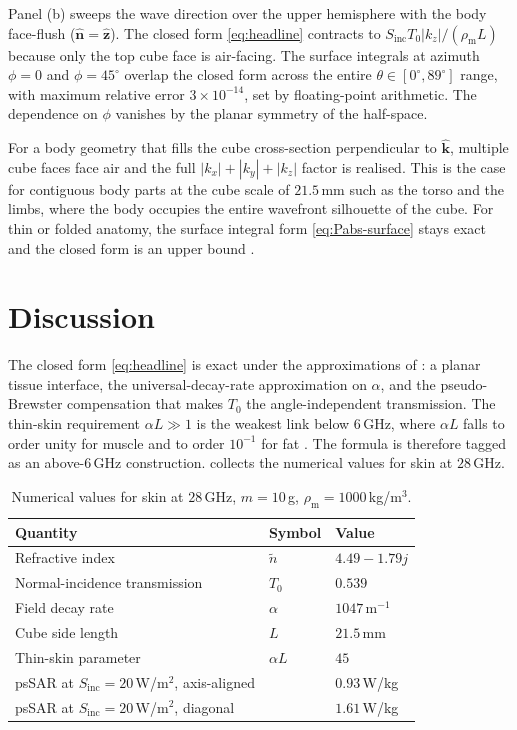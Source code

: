\documentclass[journal,twocolumn,10pt]{IEEEtran}
\theoremstyle{plain}
\theoremstyle{remark}
\newcommand{\khat}{\hat{\bm{k}}}
\newcommand{\nhat}{\hat{\bm{n}}}
\newcommand{\Sinc}{S_{\mathrm{inc}}}
\newcommand{\rhom}{\rho_{\mathrm{m}}}
\newcommand{\ntilde}{\tilde{n}}
\begin{document}
Panel (b) sweeps the wave direction over the upper hemisphere with
the body face-flush ($\nhat = \hat{\mathbf{z}}$). The closed form
\eqref{eq:headline} contracts to $\Sinc T_0 |k_z| / (\rhom L)$
because only the top cube face is air-facing. The surface integrals
at azimuth $\phi = 0$ and $\phi = 45^\circ$ overlap the closed form
across the entire $\theta \in [0^\circ, 89^\circ]$ range, with
maximum relative error $3 \times 10^{-14}$, set by floating-point
arithmetic. The dependence on $\phi$ vanishes by the planar symmetry
of the half-space.

For a body geometry that fills the cube cross-section perpendicular
to $\khat$, multiple cube faces face air and the full
$|k_x|+|k_y|+|k_z|$ factor is realised. This is the case for
contiguous body parts at the cube scale of $21.5\,$mm such as the
torso and the limbs, where the body occupies the entire wavefront
silhouette of the cube. For thin or folded anatomy, the surface
integral form \eqref{eq:Pabs-surface} stays exact and the closed
form is an upper bound \cite{WydaegheTAP_A}.


\section{Discussion}\label{sec:disc}

The closed form \eqref{eq:headline} is exact under the
approximations of \cite{WydaegheTAP_A}: a planar tissue interface,
the universal-decay-rate approximation on $\alpha$, and the
pseudo-Brewster compensation that makes $T_0$ the angle-independent
transmission. The thin-skin requirement $\alpha L \gg 1$ is the
weakest link below 6\,GHz, where $\alpha L$ falls to order unity for
muscle and to order $10^{-1}$ for fat \cite{Gabriel1996}. The
formula is therefore tagged as an above-6\,GHz construction.
 collects the numerical values for skin at
$28\,$GHz.

\begin{table}[ht]
  \centering
  \caption{Numerical values for skin at $28\,$GHz, $m = 10\,$g,
  $\rhom = 1000\,$kg/m$^3$.}
  \label{tab:summary}
  \begin{tabular}{@{}lll@{}}
    \toprule
    Quantity & Symbol & Value \\
    \midrule
    Refractive index & $\ntilde$ & $4.49 - 1.79 j$ \\
    Normal-incidence transmission & $T_0$ & $0.539$ \\
    Field decay rate & $\alpha$ & $1047\,$m$^{-1}$ \\
    Cube side length & $L$ & $21.5\,$mm \\
    Thin-skin parameter & $\alpha L$ & $45$ \\
    \addlinespace
    psSAR at $\Sinc = 20\,$W/m$^2$, axis-aligned & & $0.93\,$W/kg \\
    psSAR at $\Sinc = 20\,$W/m$^2$, diagonal & & $1.61\,$W/kg \\
    \bottomrule
  \end{tabular}
\end{table}
\end{document}
